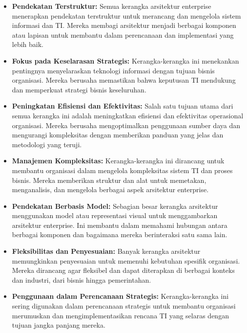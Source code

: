 \begin{itemize}
	\item \textbf{Pendekatan Terstruktur:} Semua kerangka arsitektur enterprise menerapkan pendekatan terstruktur untuk merancang dan mengelola sistem informasi dan TI. Mereka membagi arsitektur menjadi berbagai komponen atau lapisan untuk membantu dalam perencanaan dan implementasi yang lebih baik.
	
	\item \textbf{Fokus pada Keselarasan Strategis:} Kerangka-kerangka ini menekankan pentingnya menyelaraskan teknologi informasi dengan tujuan bisnis organisasi. Mereka berusaha memastikan bahwa keputusan TI mendukung dan memperkuat strategi bisnis keseluruhan.
	
	\item \textbf{Peningkatan Efisiensi dan Efektivitas:} Salah satu tujuan utama dari semua kerangka ini adalah meningkatkan efisiensi dan efektivitas operasional organisasi. Mereka berusaha mengoptimalkan penggunaan sumber daya dan mengurangi kompleksitas dengan memberikan panduan yang jelas dan metodologi yang teruji.
	
	\item \textbf{Manajemen Kompleksitas:} Kerangka-kerangka ini dirancang untuk membantu organisasi dalam mengelola kompleksitas sistem TI dan proses bisnis. Mereka memberikan struktur dan alat untuk memetakan, menganalisis, dan mengelola berbagai aspek arsitektur enterprise.
	
	\item \textbf{Pendekatan Berbasis Model:} Sebagian besar kerangka arsitektur menggunakan model atau representasi visual untuk menggambarkan arsitektur enterprise. Ini membantu dalam memahami hubungan antara berbagai komponen dan bagaimana mereka berinteraksi satu sama lain.
	
	\item \textbf{Fleksibilitas dan Penyesuaian:} Banyak kerangka arsitektur memungkinkan penyesuaian untuk memenuhi kebutuhan spesifik organisasi. Mereka dirancang agar fleksibel dan dapat diterapkan di berbagai konteks dan industri, dari bisnis hingga pemerintahan.
	
	\item \textbf{Penggunaan dalam Perencanaan Strategis:} Kerangka-kerangka ini sering digunakan dalam perencanaan strategis untuk membantu organisasi merumuskan dan mengimplementasikan rencana TI yang selaras dengan tujuan jangka panjang mereka.
\end{itemize}

